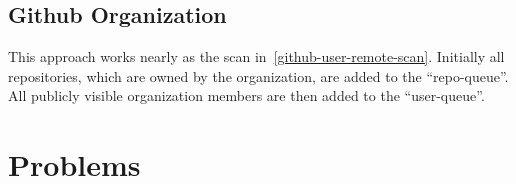 \subsection{Github Organization}
This approach works nearly as the scan in~\ref{github-user-remote-scan}.
Initially all repositories, which are owned by the organization, are added to the ``repo-queue''.
All publicly visible organization members are then added to the ``user-queue''.


\section{Problems}

